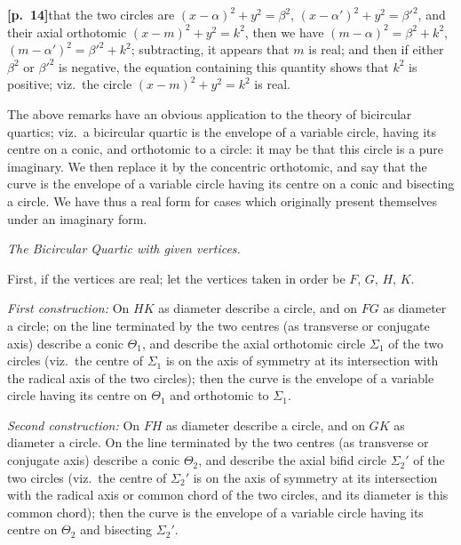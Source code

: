 \documentclass[11pt,a4paper]{article}
\begin{document}
\bigskip

\noindent\textbf{[p.~14]}\quad that the two circles are $(x - \alpha)^{2} + y^{2} = \beta^{2}$, $(x - \alpha')^{2} + y^{2} = \beta'^{2}$, and their axial orthotomic $(x - m)^{2} + y^{2} = k^{2}$, then we have $(m - \alpha)^{2} = \beta^{2} + k^{2}$, $(m - \alpha')^{2} = \beta'^{2} + k^{2}$; subtracting, it appears that $m$ is real; and then if either $\beta^{2}$ or $\beta'^{2}$ is negative, the equation containing this quantity shows that $k^{2}$ is positive; viz.\ the circle $(x - m)^{2} + y^{2} = k^{2}$ is real.

\medskip

The above remarks have an obvious application to the theory of bicircular quartics; viz.\ a bicircular quartic is the envelope of a variable circle, having its centre on a conic, and orthotomic to a circle: it may be that this circle is a pure imaginary. We then replace it by the concentric orthotomic, and say that the curve is the envelope of a variable circle having its centre on a conic and bisecting a circle. We have thus a real form for cases which originally present themselves under an imaginary form.

\bigskip

\begin{center}
\textit{The Bicircular Quartic with given vertices.}
\end{center}

\medskip

First, if the vertices are real; let the vertices taken in order be $F$, $G$, $H$, $K$.

\medskip

\noindent\textit{First construction:} On $HK$ as diameter describe a circle, and on $FG$ as diameter a circle; on the line terminated by the two centres (as transverse or conjugate axis) describe a conic $\Theta_{1}$, and describe the axial orthotomic circle $\Sigma_{1}$ of the two circles (viz.\ the centre of $\Sigma_{1}$ is on the axis of symmetry at its intersection with the radical axis of the two circles); then the curve is the envelope of a variable circle having its centre on $\Theta_{1}$ and orthotomic to $\Sigma_{1}$.

\medskip

\noindent\textit{Second construction:} On $FH$ as diameter describe a circle, and on $GK$ as diameter a circle. On the line terminated by the two centres (as transverse or conjugate axis) describe a conic $\Theta_{2}$, and describe the axial bifid circle $\Sigma_{2}'$ of the two circles (viz.\ the centre of $\Sigma_{2}'$ is on the axis of symmetry at its intersection with the radical axis or common chord of the two circles, and its diameter is this common chord); then the curve is the envelope of a variable circle having its centre on $\Theta_{2}$ and bisecting $\Sigma_{2}'$.
\end{document}
